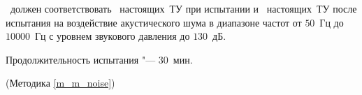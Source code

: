 \dut \ должен соответствовать \treb \ настоящих~ТУ при испытании и \trebafter \ настоящих~ТУ после испытания на воздействие акустического шума в диапазоне частот от $50$~Гц до~$10000$~Гц с уровнем звукового давления до $130$~дБ.

Продолжительность испытания "--- $30$~мин.

\begin{flushright}
	(Методика \ref{m_m_noise})
\end{flushright}